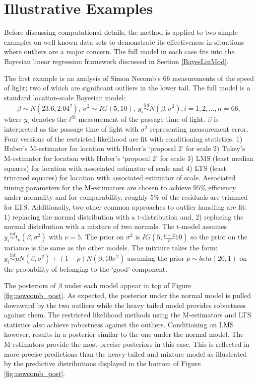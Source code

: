 \documentclass[12pt]{article}
\newcommand{\iid}{\stackrel{iid}{\sim}}
\begin{document}
\section{Illustrative Examples}
\label{illustrations}
Before discussing computational details, the method is applied to two simple examples on well known data sets to demonstrate its effectiveness in situations where outliers are a major concern. The full model in each case fits into the Bayesian linear regression framework discussed in Section \ref{BayesLinMod}. %

The first example is an analysis of Simon Necomb's 66 measurements of the speed of light; two of which are significant outliers in the lower tail. The full model is a standard location-scale Bayesian model:
\begin{equation}
\beta\sim N(23.6, 2.04^{2}),\  \sigma^{2}\sim IG(5, 10), \ y_{i}\iid N (\beta, \sigma^{2}), i=1,2,\dots, n=66,
\end{equation}
where $y_{i}$ denotes the $i^{th}$ measurement of the passage time of light. $\beta$ is interpreted as the passage time of light with $\sigma^{2}$ representing measurement error.
Four versions of the restricted likelihood are fit with conditioning statistics: 1) Huber's M-estimator for location with Huber's `proposal 2'  for scale 2)  Tukey's M-estimator for location with Huber's `proposal 2'  for scale 3) LMS (least median squares) for location with associated estimator of scale and 4) LTS (least trimmed squares)  for location with associated estimator of scale. Associated tuning parameters for the M-estimators are chosen to achieve $95\%$ efficiency under normality \cite{huber1964} and for comparability, roughly $5\%$ of the residuals are trimmed for LTS.  Additionally, two other common approaches to outlier handling are fit: 1) replacing the normal distribution with a t-distribution and, 2) replacing the normal distribution with a mixture of two normals. The t-model assumes $y_{i}\iid t_{\nu} (\beta, \sigma^{2})$ with $\nu=5$. The prior on $\sigma^{2}$ is $IG(5, \frac{\nu-2}{\nu}10)$ so the prior on the variance is the same as the other models. The mixture takes the form: $y_{i}\iid pN (\beta, \sigma^{2}) + (1-p)N(\beta, 10\sigma^{2})$ assuming the prior $p \sim beta(20,1)$ on the probability of belonging to the `good' component.  

The posteriors of $\beta$ under each model appear in top of Figure \ref{fig:newcomb_post}. As expected, the posterior under the normal model is pulled downward by the two outliers while the heavy tailed model provides robustness against them. The restricted likelihood methods using the M-estimators and LTS statistics also achieve robustness against the outliers. Conditioning on LMS however, results in a posterior similar to the one under the normal model. The M-estimators provide the most precise posteriors in this case. This is reflected in more precise predictions than the heavy-tailed and mixture model as illustrated by the predictive distributions displayed in the bottom of Figure \ref{fig:newcomb_post}.
\end{document}
